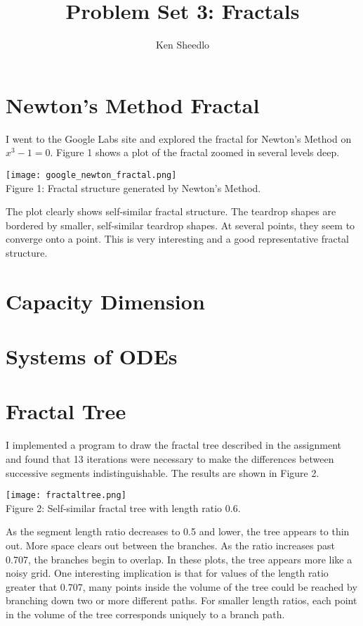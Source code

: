 \documentclass[12pt, letterpaper]{article}
\title{Problem Set 3: Fractals}
\author{Ken Sheedlo}
\begin{document}
\maketitle{}

\section*{Newton's Method Fractal}

I went to the Google Labs site and explored the fractal for Newton's Method on
$x^3 - 1 = 0$. Figure 1 shows a plot of the fractal zoomed in several levels 
deep.

\begin{center}
\texttt{[image: google\_newton\_fractal.png]}
\\
Figure 1: Fractal structure generated by Newton's Method.
\end{center}

The plot clearly shows self-similar fractal structure. The teardrop shapes are 
bordered by smaller, self-similar teardrop shapes. At several points, they seem
to converge onto a point. This is very interesting and a good representative
fractal structure.

\section*{Capacity Dimension}

\section*{Systems of ODEs}

\section*{Fractal Tree}

I implemented a program to draw the fractal tree described in the assignment and
found that 13 iterations were necessary to make the differences between 
successive segments indistinguishable. The results are shown in Figure 2.

\begin{center}
\texttt{[image: fractaltree.png]}
\\
Figure 2: Self-similar fractal tree with length ratio 0.6.
\end{center}

As the segment length ratio decreases to 0.5 and lower, the tree appears to thin
out. More space clears out between the branches. As the ratio increases past 
0.707, the branches begin to overlap. In these plots, the tree appears more like
a noisy grid. One interesting implication is that for values of the length ratio
greater that 0.707, many points inside the volume of the tree could be reached
by branching down two or more different paths. For smaller length ratios, each 
point in the volume of the tree corresponds uniquely to a branch path.
\end{document}
